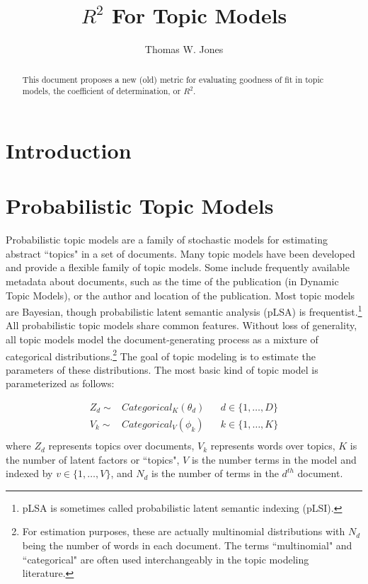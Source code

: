 \documentclass[12pt]{amsart}
\title{$R^2$ For Topic Models}
\author{Thomas W. Jones}
\begin{document}
\maketitle

\begin{abstract}
This document proposes a new (old) metric for evaluating goodness of fit in topic models, the coefficient of determination, or $R^2$.
\end{abstract}

\section{Introduction}

\section{Probabilistic Topic Models}
Probabilistic topic models are a family of stochastic models for estimating abstract ``topics" in a set of documents. Many topic models have been developed and provide a flexible family of topic models. Some include frequently available metadata about documents, such as the time of the publication (in Dynamic Topic Models), or the author and location of the publication. Most topic models are Bayesian, though probabilistic latent semantic analysis (pLSA) is frequentist.\footnote{pLSA is sometimes called probabilistic latent semantic indexing (pLSI).} All probabilistic topic models share common features. Without loss of generality, all topic models model the document-generating process as a mixture of categorical distributions.\footnote{For estimation purposes, these are actually multinomial distributions with $N_d$ being the number of words in each document. The terms ``multinomial" and ``categorical" are often used interchangeably in the topic modeling literature.} The goal of topic modeling is to estimate the parameters of these distributions. The most basic kind of topic model is parameterized as follows:

\begin{align*}
Z_d \sim& Categorical_K({\theta}_d) && d\in \{1, \ldots, D\}\\
V_k \sim& Categorical_V({\phi}_{k}) && k\in \{1, \ldots, K\}\\
\end{align*} where $Z_d$ represents topics over documents, $V_k$ represents words over topics, $K$ is the number of latent factors or ``topics", $V$ is the number terms in the model and indexed by $v \in \{1, \ldots, V\}$, and $N_d$ is the number of terms in the $d^{th}$ document. 
\end{document}
